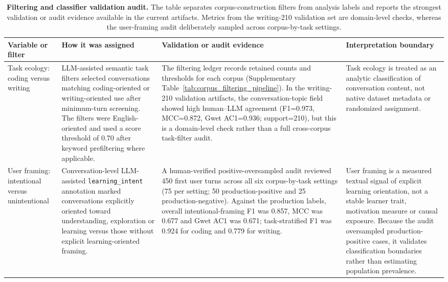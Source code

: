\begin{table}
\fontsize{7.2pt}{8.4pt}\selectfont
\centering
\caption{\textbf{Filtering and classifier validation audit.} The table separates corpus-construction filters from analysis labels and reports the strongest validation or audit evidence available in the current artifacts. Metrics from the writing-210 validation set are domain-level checks, whereas the user-framing audit deliberately sampled across corpus-by-task settings.}
\label{tab:filter_classifier_validation}
\setlength{\tabcolsep}{4pt}
\renewcommand{\arraystretch}{1.12}
\begin{tabularx}{\textheight}{>{\raggedright\arraybackslash}p{0.15\textheight}>{\raggedright\arraybackslash}p{0.24\textheight}>{\raggedright\arraybackslash}p{0.25\textheight}>{\raggedright\arraybackslash}X}
\toprule
Variable or filter & How it was assigned & Validation or audit evidence & Interpretation boundary \\
\midrule
Task ecology: coding versus writing & LLM-assisted semantic task filters selected conversations matching coding-oriented or writing-oriented use after minimum-turn screening. The filters were English-oriented and used a score threshold of 0.70 after keyword prefiltering where applicable. & The filtering ledger records retained counts and thresholds for each corpus (Supplementary Table~\ref{tab:corpus_filtering_pipeline}). In the writing-210 validation artifacts, the conversation-topic field showed high human--LLM agreement (F1=0.973, MCC=0.872, Gwet AC1=0.936; support=210), but this is a domain-level check rather than a full cross-corpus task-filter audit. & Task ecology is treated as an analytic classification of conversation content, not native dataset metadata or randomized assignment. \\
\addlinespace
User framing: intentional versus unintentional & Conversation-level LLM-assisted \texttt{learning\_intent} annotation marked conversations explicitly oriented toward understanding, exploration or learning versus those without explicit learning-oriented framing. & A human-verified positive-oversampled audit reviewed 450 first user turns across all six corpus-by-task settings (75 per setting; 50 production-positive and 25 production-negative). Against the production labels, overall intentional-framing F1 was 0.857, MCC was 0.677 and Gwet AC1 was 0.671; task-stratified F1 was 0.924 for coding and 0.779 for writing. & User framing is a measured textual signal of explicit learning orientation, not a stable learner trait, motivation measure or causal exposure. Because the audit oversampled production-positive cases, it validates classification boundaries rather than estimating population prevalence. \\

\end{tabularx}
\end{table}
